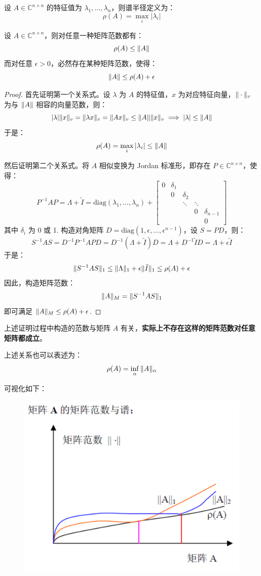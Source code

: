 \begin{definition}[谱半径]
设 $A\in\mathbb C^{n\times n}$ 的特征值为 $\lambda_1,\ldots,\lambda_n$，则谱半径定义为：
\[
    \rho(A)=\max_i|\lambda_i|
\]
\end{definition}
\begin{theorem}[谱半径是矩阵范数的下确界]
\label{thm:specrad-norm}
设 $A\in\mathbb C^{n\times n}$，则对任意一种矩阵范数都有：
\[
    \rho(A)\leq\Vert A\Vert
\]
而对任意 $\epsilon>0$，必然存在某种矩阵范数，使得：
\[
    \Vert A\Vert\leq \rho(A)+\epsilon
\]
\end{theorem}
\begin{proof}
首先证明第一个关系式。设 $\lambda$ 为 $A$ 的特征值，$x$ 为对应特征向量，$\Vert\cdot\Vert_v$ 为与 $\Vert A\Vert$ 相容的向量范数，则：
\[
    |\lambda|\Vert x\Vert_v=\Vert\lambda x\Vert_v=\Vert Ax\Vert_v\leq\Vert A\Vert\Vert x\Vert_v\implies |\lambda|\leq\Vert A\Vert
\]
于是：
\[
    \rho(A)=\max_i|\lambda_i|\leq\Vert A\Vert
\]

然后证明第二个关系式。将 $A$ 相似变换为 Jordan 标准形，即存在 $P\in\mathbb C^{n\times n}$，使得：
\[
    P^{-1}AP=\Lambda+\tilde I=\text{diag}(\lambda_1,\ldots,\lambda_n)+
    \begin{bmatrix}
    0&\delta_1&&&\\
    &0&\delta_2&&\\
    &&\ddots&\ddots&\\
    &&&0&\delta_{n-1}\\
    &&&&0
    \end{bmatrix}
\]
其中 $\delta_i$ 为 0 或 1.  构造对角矩阵 $D=\text{diag}(1,\epsilon,\ldots,\epsilon^{n-1})$，设 $S=PD$，则：
\[
    S^{-1}AS=D^{-1}P^{-1}APD=D^{-1}(\Lambda+\tilde I)D=\Lambda+D^{-1}\tilde ID=\Lambda+\epsilon\tilde I
\]
于是：
\[
    \Vert S^{-1}AS\Vert_1\leq\Vert\Lambda\Vert_1+\epsilon\Vert\tilde I\Vert_1\leq\rho(A)+\epsilon
\]
因此，构造矩阵范数：
\[
    \Vert A\Vert_M=\Vert S^{-1}AS\Vert_1
\]
即可满足 $\Vert A\Vert_M\leq\rho(A)+\epsilon$.
\end{proof}

\begin{note}
上述证明过程中构造的范数与矩阵 $A$ 有关，\textbf{实际上不存在这样的矩阵范数对任意矩阵都成立}。
\end{note}

\begin{remark}
上述关系也可以表述为：
\[
    \rho(A)=\inf_\alpha\Vert A\Vert_\alpha
\]

可视化如下：

\begin{figure}[H]
    \centering
    \includegraphics[width=0.4\linewidth]{figs/rho.png}
\end{figure}
\end{remark}

